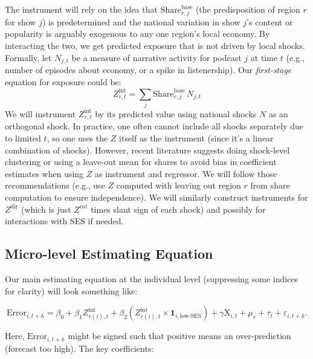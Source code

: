 \documentclass[12pt]{article}
\begin{document}
The instrument will rely on the idea that $\text{Share}_{r,j}^{\text{base}}$ (the predisposition of region $r$ for show $j$) is predetermined and the national variation in show $j$'s content or popularity is arguably exogenous to any one region's local economy. By interacting the two, we get predicted exposure that is not driven by local shocks.
Formally, let $N_{j,t}$ be a measure of narrative activity for podcast $j$ at time $t$ (e.g., number of episodes about economy, or a spike in listenership). Our \emph{first-stage} equation for exposure could be:
$$
    Z_{r,t}^\text{int} = \sum_j \text{Share}_{r,j}^\text{base} \, N_{j,t}
$$
We will instrument $Z^{\text{int}}_{r,t}$ by its predicted value using national shocks $N$ as an orthogonal shock. In practice, one often cannot include all shocks separately due to limited $t$, so one uses the $Z$ itself as the instrument (since it's a linear combination of shocks). However, recent literature suggests doing shock-level clustering or using a leave-out mean for shares to avoid bias in coefficient estimates when using $Z$ as instrument and regressor. We will follow those recommendations (e.g., use $Z$ computed with leaving out region $r$ from share computation to ensure independence).
We will similarly construct instruments for $Z^{\text{dir}}$ (which is just $Z^{int}$ times slant sign of each shock) and possibly for interactions with SES if needed.

\subsection{Micro-level Estimating Equation}
Our main estimating equation at the individual level (suppressing some indices for clarity) will look something like:

\begin{equation}
    \label{eq:main}
    \text{Error}_{i,t+h} = \beta_0 + \beta_1 Z^{\text{int}}_{r(i),t} + \beta_2 \left(Z^{\text{int}}_{r(i),t} \times \mathbf{1}_{i,\text{low-SES}}\right) + \gamma \text{X}_{i,t} + \mu_r + \tau_t + \varepsilon_{i,t+h}.
\end{equation}

Here, $\text{Error}_{i,t+h}$ might be signed such that positive means an over-prediction (forecast too high). The key coefficients:
\end{document}
